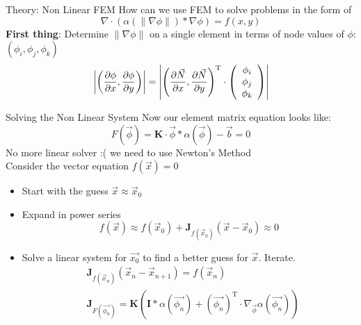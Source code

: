 \documentclass{beamer}
\begin{document}
    \begin{frame}{Theory: Non Linear FEM}
        How can we use FEM to solve problems in the form of
        \[\nabla\cdot\left(\alpha(\|\nabla\phi\|)*\nabla\phi\right)=f(x,y)\]
        \textbf{First thing}: Determine $\|\nabla\phi\|$ on a single element in terms of node values of $\phi$: $\left( \phi_i, \phi_j, \phi_k \right)$
        \[\left|\left(\pdv{\phi}{x},\pdv{\phi}{y}\right)\right|=\left|\left(\pdv{\vec{N}}{x}, \pdv{\vec{N}}{y} \right)^{\text{T}}\cdot \left(
        \begin{array}{c}
            \phi _i \\
            \phi _j \\
            \phi _k \\
        \end{array}
        \right)\right|\]
    \end{frame}
    \begin{frame}{Solving the Non Linear System}
        Now our element matrix equation looks like:
        \[F(\vec{\phi})=\mathbf{K}\cdot\vec{\phi}*\alpha(\vec{\phi})-\vec{b}=0\]
        No more linear solver :( we need to use Newton's Method\\
        \smallbreak
        Consider the vector equation $f(\vec{x})=0$
        \begin{itemize}
            \item Start with the guess $\vec{x}\approx\vec{x}_0$
            \item Expand in power series
            \[f(\vec{x})\approx f(\vec{x}_0)+\mathbf{J}_{f(\vec{x}_0)}(\vec{x}-\vec{x}_0)\approx 0\]
            \item Solve a linear system for $\vec{x_0}$ to find a better guess for $\vec{x}$.
            Iterate.
            \begin{align*}
                &\mathbf{J}_{f(\vec{x}_n)}\left(\vec{x}_{n}-\vec{x}_{n+1}\right)=f(\vec{x}_{n})\\
                &\mathbf{J}_{F(\vec{\phi_n})}=\mathbf{K}\left( \mathbf{I}*\alpha(\vec{\phi_n})+\left(\vec{\phi_n}\right)^{\text{T}}\cdot \nabla_{\vec{\phi}}\alpha(\vec{\phi_n}) \right)\\
            \end{align*}
        \end{itemize}
    \end{frame}
\end{document}
